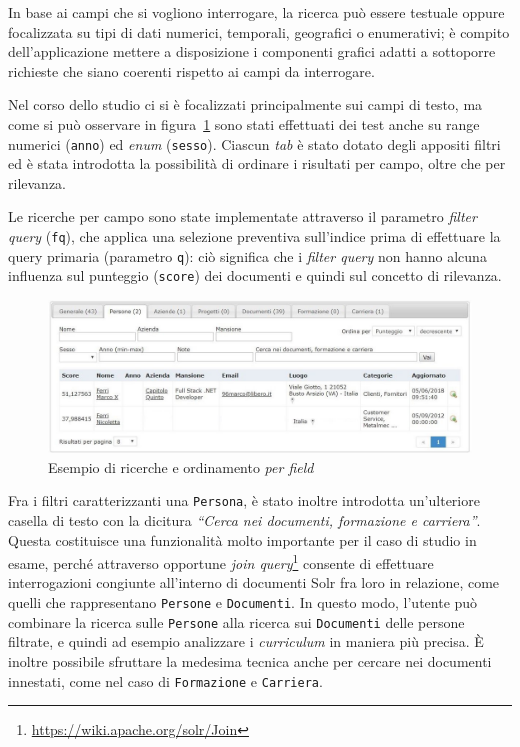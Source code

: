 In base ai campi che si vogliono interrogare, la ricerca può essere testuale oppure focalizzata su tipi di dati numerici, temporali, geografici o enumerativi; è compito dell’applicazione mettere a disposizione i componenti grafici adatti a sottoporre richieste che siano coerenti rispetto ai campi da interrogare.

\vspace{1em}

Nel corso dello studio ci si è focalizzati principalmente sui campi di testo, ma come si può osservare in figura~\ref{fig:gui3} sono stati effettuati dei test anche su range numerici (\texttt{anno}) ed \textit{enum} (\texttt{sesso}). Ciascun \textit{tab} è stato dotato degli appositi filtri ed è stata introdotta la possibilità di ordinare i risultati per campo, oltre che per rilevanza.

Le ricerche per campo sono state implementate attraverso il parametro \textit{filter query} (\texttt{fq}), che applica una selezione preventiva sull’indice prima di effettuare la query primaria (parametro \texttt{q}): ciò significa che i \textit{filter query} non hanno alcuna influenza sul punteggio (\texttt{score}) dei documenti e quindi sul concetto di rilevanza.

\begin{figure}[H]
	\centering
	\includegraphics[scale=0.63]{../images/03_4_per_field_search}
	\caption[Esempio di ricerche e ordinamento \textit{per field}]{Esempio di ricerche e ordinamento \textit{per field}}
	\label{fig:gui3}
\end{figure}

Fra i filtri caratterizzanti una \texttt{Persona}, è stato inoltre introdotta un’ulteriore casella di testo con la dicitura \textit{“Cerca nei documenti, formazione e carriera”}. Questa costituisce una funzionalità molto importante per il caso di studio in esame, perché attraverso opportune \textit{join query}\footnote{\url{https://wiki.apache.org/solr/Join}} consente di effettuare interrogazioni congiunte all’interno di documenti Solr fra loro in relazione, come quelli che rappresentano \texttt{Persone} e \texttt{Documenti}. In questo modo, l’utente può combinare la ricerca sulle \texttt{Persone} alla ricerca sui \texttt{Documenti} delle persone filtrate, e quindi ad esempio analizzare i \textit{curriculum} in maniera più precisa. È inoltre possibile sfruttare la medesima tecnica anche per cercare nei documenti innestati, come nel caso di \texttt{Formazione} e \texttt{Carriera}.



